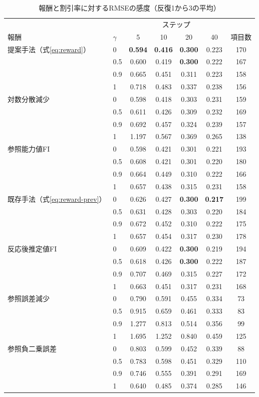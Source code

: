 \documentclass[a4paper,12pt,oneside,openany]{jsbook}
\begin{document}
\begin{table}[t]
\centering
\caption{報酬と割引率に対するRMSEの感度（反復1から3の平均）}
\label{tab:sensitivity}
\footnotesize
\setlength{\tabcolsep}{3pt}
\begin{tabular}{llccccc}
\hline
 & & \multicolumn{4}{c}{ステップ} & \\
報酬 & $\gamma$ & 5 & 10 & 20 & 40 & 項目数\\
\hline
提案手法（式\eqref{eq:reward}） & 0 & \textbf{0.594} & \textbf{0.416} & \textbf{0.300} & 0.223 & 170\\
 & 0.5 & 0.600 & 0.419 & \textbf{0.300} & 0.222 & 167\\
 & 0.9 & 0.665 & 0.451 & 0.311 & 0.223 & 158\\
 & 1 & 0.718 & 0.483 & 0.337 & 0.238 & 156\\
\hline
対数分散減少 & 0 & 0.598 & 0.418 & 0.303 & 0.231 & 159\\
 & 0.5 & 0.611 & 0.426 & 0.309 & 0.232 & 169\\
 & 0.9 & 0.692 & 0.457 & 0.324 & 0.239 & 157\\
 & 1 & 1.197 & 0.567 & 0.369 & 0.265 & 138\\
\hline
参照能力値FI & 0 & 0.598 & 0.421 & 0.301 & 0.221 & 193\\
 & 0.5 & 0.608 & 0.421 & 0.301 & 0.220 & 180\\
 & 0.9 & 0.664 & 0.449 & 0.310 & 0.222 & 166\\
 & 1 & 0.657 & 0.438 & 0.315 & 0.231 & 158\\
\hline
既存手法（式\eqref{eq:reward-prev}） & 0 & 0.626 & 0.427 & \textbf{0.300} & \textbf{0.217} & 199\\
 & 0.5 & 0.631 & 0.428 & 0.303 & 0.220 & 184\\
 & 0.9 & 0.672 & 0.452 & 0.310 & 0.222 & 175\\
 & 1 & 0.657 & 0.454 & 0.317 & 0.230 & 178\\
\hline
反応後推定値FI & 0 & 0.609 & 0.422 & \textbf{0.300} & 0.219 & 194\\
 & 0.5 & 0.618 & 0.426 & \textbf{0.300} & 0.222 & 187\\
 & 0.9 & 0.707 & 0.469 & 0.315 & 0.227 & 172\\
 & 1 & 0.663 & 0.451 & 0.317 & 0.231 & 168\\
\hline
参照誤差減少 & 0 & 0.790 & 0.591 & 0.455 & 0.334 & 73\\
 & 0.5 & 0.915 & 0.659 & 0.461 & 0.333 & 83\\
 & 0.9 & 1.277 & 0.813 & 0.514 & 0.356 & 99\\
 & 1 & 1.695 & 1.252 & 0.840 & 0.459 & 125\\
\hline
参照負二乗誤差 & 0 & 0.803 & 0.599 & 0.452 & 0.339 & 88\\
 & 0.5 & 0.783 & 0.598 & 0.451 & 0.329 & 110\\
 & 0.9 & 0.746 & 0.555 & 0.391 & 0.291 & 169\\
 & 1 & 0.640 & 0.485 & 0.374 & 0.285 & 146\\
\hline
\end{tabular}
\end{table}
\end{document}
